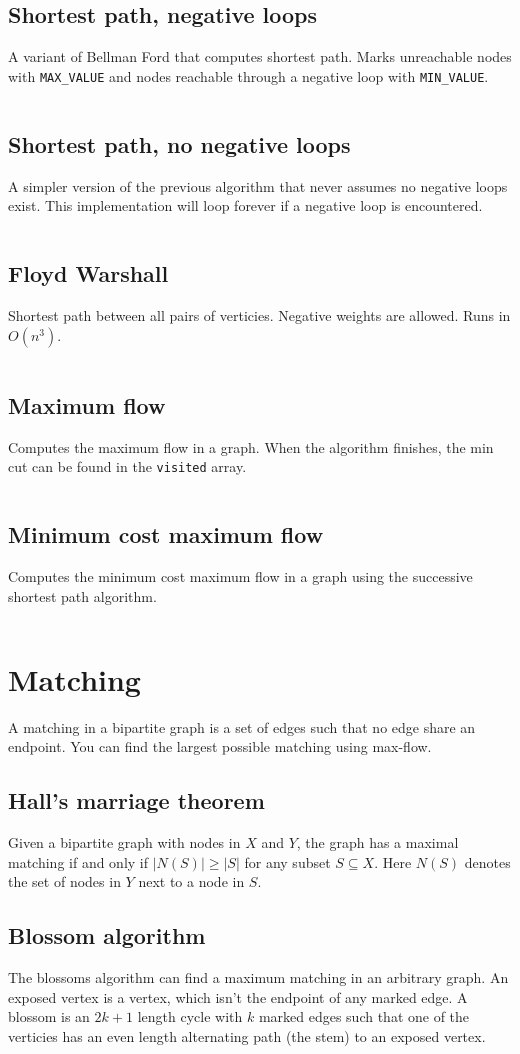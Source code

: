 \documentclass[10pt,a4paper,landscape,oneside]{amsart}
\newcommand{\code}[1]{\inputminted[fontsize=\large,tabsize=2,baselinestretch=1]{java}{#1}}
\begin{document}
\begin{multicols*}{2}
\subsection{Shortest path, negative loops}
A variant of Bellman Ford that computes shortest path. Marks unreachable nodes with
\verb|MAX_VALUE| and nodes reachable through a negative loop with \verb|MIN_VALUE|.
\code{graph/shortest-path.java}
\subsection{Shortest path, no negative loops}
A simpler version of the previous algorithm that never assumes no negative loops exist.
This implementation will loop forever if a negative loop is encountered.
\code{graph/shortest-path-noloop.java}
\subsection{Floyd Warshall}
Shortest path between all pairs of verticies. Negative weights are allowed. Runs in
\(O(n^3)\).
\code{graph/floyd-warshall.java}
\subsection{Maximum flow}
Computes the maximum flow in a graph. When the algorithm finishes, the min cut can be
found in the \texttt{visited} array.
\code{graph/max-flow.java}
\subsection{Minimum cost maximum flow}
Computes the minimum cost maximum flow in a graph using the successive shortest path
algorithm.
\code{graph/min-cost-max-flow.java}

\section{Matching}
A matching in a bipartite graph is a set of edges such that no edge share an endpoint.
You can find the largest possible matching using max-flow.
\subsection{Hall's marriage theorem}
Given a bipartite graph with nodes in \(X\) and \(Y\), the graph has a maximal matching
if and only if \(|N(S)| \geq |S|\) for any subset \(S \subseteq X\). Here \(N(S)\)
denotes the set of nodes in \(Y\) next to a node in \(S\).
\subsection{Blossom algorithm}
The blossoms algorithm can find a maximum matching in an arbitrary graph. An exposed
vertex is a vertex, which isn't the endpoint of any marked edge. A blossom is an
\(2k+1\) length cycle with \(k\) marked edges such that one of the verticies has an even
length alternating path (the stem) to an exposed vertex.


\end{multicols*}
\end{document}
